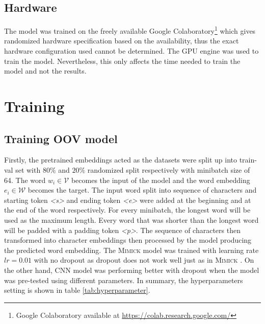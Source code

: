     \subsection{Hardware}
        The model was trained on the freely available Google
        Colaboratory\footnote{Google Colaboratory available at
        \url{https://colab.research.google.com/}} which gives
        randomized hardware specification based on the availability,
        thus the exact hardware configuration used cannot be
        determined. The GPU engine was used to train the model.
        Nevertheless, this only affects the time needed to train the
        model and not the results.

\section{Training}
    \subsection{Training OOV model}
        Firstly, the pretrained embeddings acted as the datasets were
        split up into train-val set with $80\%$ and $20\%$ randomized
        split respectively with minibatch size of 64. The word $w_i
        \in \mathcal{V}$ becomes the input of the model and the word
        embedding $e_i \in \mathcal{W}$ becomes the target. The input
        word split into sequence of characters and starting token
        \textit{\textless s\textgreater} and ending token
        \textit{\textless e\textgreater} were added at the beginning
        and at the end of the word respectively. For every minibatch,
        the longest word will be used as the maximum length. Every
        word that was shorter than the longest word will be padded
        with a padding token \textit{\textless p\textgreater}.
        The sequence of characters then transformed into character
        embeddings then processed by the model producing the predicted
        word embedding. The \textsc{Mimick} model was trained with
        learning rate $lr = 0.01$ with no dropout as dropout does not
        work well just as in \textsc{Mimick}
        \citep{mimicking2017Pinter}. On the other hand, CNN model was
        performing better with dropout when the model was pre-tested
        using different parameters. In summary, the hyperparameters
        setting is shown in table \ref{tab:hyperparameter}.

